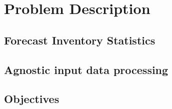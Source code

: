 \chapter{Problem Description}\label{chap:chap3}

\section*{}


\section{Forecast Inventory Statistics}

\section{Agnostic input data processing}

\section{Objectives}

